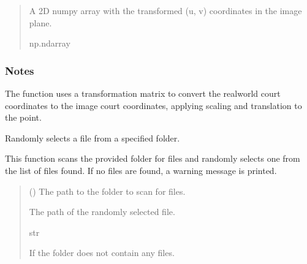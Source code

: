 \documentclass[letterpaper,10pt,english]{sphinxmanual}
\begin{document}
\begin{fulllineitems}
\begin{quote}
\begin{description}
\begin{itemize}
\end{itemize}

\sphinxAtStartPar
A 2D numpy array with the transformed (u, v) coordinates in the image plane.

\sphinxAtStartPar
np.ndarray

\end{description}\end{quote}
\subsubsection*{Notes}

\sphinxAtStartPar
The function uses a transformation matrix to convert the real\sphinxhyphen{}world court coordinates
to the image court coordinates, applying scaling and translation to the point.

\end{fulllineitems}


\begin{fulllineitems}
\label{\detokenize{CameraUtils:CameraUtils.SampleFile}}
\pysigstartsignatures
{}
\pysigstopsignatures
\sphinxAtStartPar
Randomly selects a file from a specified folder.

\sphinxAtStartPar
This function scans the provided folder for files and randomly selects one from the list of files found. If no files are found, a warning message is printed.
\begin{quote}\begin{description}
\sphinxAtStartPar
{} () \textendash{} The path to the folder to scan for files.

\sphinxAtStartPar
The path of the randomly selected file.

\sphinxAtStartPar
str

\sphinxAtStartPar
{} \textendash{} If the folder does not contain any files.

\end{description}\end{quote}

\end{fulllineitems}
\end{document}
